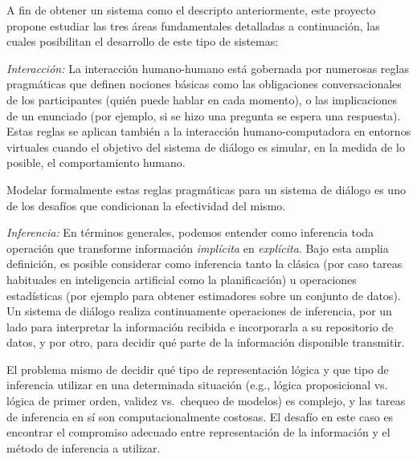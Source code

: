 A fin de obtener un sistema como el descripto anteriormente, este proyecto propone estudiar las tres \'areas fundamentales detalladas a continuaci\'on, las cuales posibilitan el desarrollo de este tipo de sistemas:
\begin{myitemize}
  \item \emph{Interacci\'on:} La interacci\'on humano-humano est\'a gobernada
  por numerosas reglas pragm\'aticas que definen nociones b\'asicas como
  las obligaciones conversacionales de los participantes (qui\'en puede hablar en cada momento), o las implicaciones de un enunciado (por ejemplo, si se
  hizo una pregunta se espera una respuesta).
  Estas reglas se aplican tambi\'en a la interacci\'on humano-computadora en
  entornos virtuales cuando el objetivo del sistema de di\'alogo es
  simular, en la medida de lo posible, el comportamiento humano.

  Modelar formalmente estas reglas pragm\'aticas para un sistema de di\'alogo es uno de los desaf\'ios que condicionan la efectividad del mismo.

  \item \emph{Inferencia:} En t\'erminos generales, podemos entender como
  inferencia toda operaci\'on que transforme informaci\'on \textit{impl\'icita} en
  \textit{expl\'icita}.  Bajo esta amplia definici\'on, es posible considerar como
  inferencia tanto la cl\'asica (por caso
  tareas habituales en inteligencia artificial como la planificaci\'on) u operaciones estad\'isticas (por ejemplo para obtener estimadores sobre un conjunto de datos).  Un sistema de di\'alogo realiza continuamente operaciones de inferencia, por un lado   para interpretar la informaci\'on recibida e incorporarla a su repositorio de datos, y por otro, para decidir qu\'e parte de la informaci\'on disponible transmitir.

  El problema mismo de decidir qu\'e tipo de representaci\'on l\'ogica y que tipo de inferencia utilizar en una determinada situaci\'on (e.g., l\'ogica proposicional vs. l\'ogica de primer orden, validez vs.\ chequeo de modelos) es complejo, y las tareas de inferencia en s\'i son computacionalmente costosas.  El desaf\'io en este caso es encontrar el compromiso adecuado entre representaci\'on de la informaci\'on y el m\'etodo de inferencia a utilizar.


\end{myitemize}
